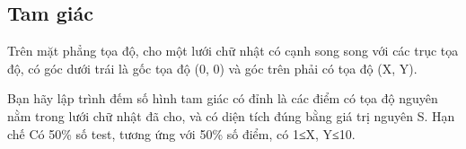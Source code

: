 \subsection{   Tam giác  }

   Trên mặt phẳng tọa độ, cho một lưới chữ nhật có cạnh song song với các trục tọa độ,  có góc dưới   trái là gốc tọa độ (0, 0) và góc trên phải  có tọa độ (X, Y).  

   Bạn hãy lập trình đếm số hình tam giác có đỉnh là các điểm có tọa độ nguyên nằm trong lưới chữ   nhật đã cho, và có diện tích đúng bằng giá trị nguyên S.
Hạn chế
Có 50\% số test, tương ứng với 50\% số điểm, có 1≤X, Y≤10.